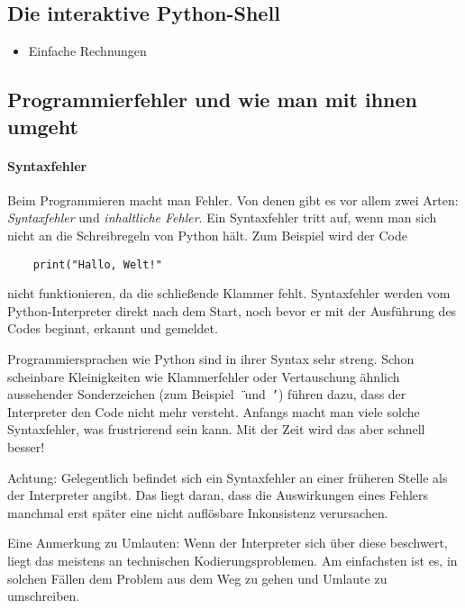 \documentclass{blatt}
\begin{document}
\subsection{Die interaktive Python-Shell}

\begin{itemize}
\item Einfache Rechnungen
\end{itemize}


\subsection{Programmierfehler und wie man mit ihnen umgeht}

\paragraph{Syntaxfehler}
Beim Programmieren macht man Fehler. Von denen gibt es vor allem zwei Arten:
\emph{Syntaxfehler} und \emph{inhaltliche Fehler}. Ein Syntaxfehler tritt auf,
wenn man sich nicht an die Schreibregeln von Python hält. Zum Beispiel wird der
Code
\begin{verbatim}
    print("Hallo, Welt!"
\end{verbatim}
nicht funktionieren, da die schließende Klammer fehlt. Syntaxfehler werden vom
Python-Interpreter direkt nach dem Start, noch bevor er mit der Ausführung des
Codes beginnt, erkannt und gemeldet.

Programmiersprachen wie Python sind in ihrer Syntax sehr streng. Schon
scheinbare Kleinigkeiten wie Klammerfehler oder Vertauschung ähnlich
aussehender Sonderzeichen (zum Beispiel~\texttt{\"{}} und~\texttt{'}) führen
dazu, dass der Interpreter den Code nicht mehr versteht. Anfangs macht man
viele solche Syntaxfehler, was frustrierend sein kann. Mit der Zeit wird das
aber schnell besser!

Achtung: Gelegentlich befindet sich ein Syntaxfehler an einer früheren Stelle
als der Interpreter angibt. Das liegt daran, dass die Auswirkungen eines
Fehlers manchmal erst später eine nicht auflösbare Inkonsistenz verursachen.

Eine Anmerkung zu Umlauten: Wenn der Interpreter sich über diese beschwert,
liegt das meistens an technischen Kodierungsproblemen. Am einfachsten ist es,
in solchen Fällen dem Problem aus dem Weg zu gehen und Umlaute zu umschreiben.
\end{document}
